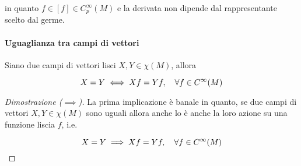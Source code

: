 in quanto $ f \in [f] \in C_{p}^{\infty}(M) $ e la derivata non dipende dal rappresentante scelto dal germe.

\paragraph{Uguaglianza tra campi di vettori}

\begin{theorem}
	Siano due campi di vettori lisci $ X,Y \in \chi(M) $, allora
	
	\begin{equation}
		X = Y \iff X f = Y f \qcomma \forall f \in C^{\infty}(M)
	\end{equation}
\end{theorem}

\begin{proof}[Dimostrazione ($ \implies $)]
	La prima implicazione è banale in quanto, se due campi di vettori $ X,Y \in \chi(M) $ sono uguali allora anche lo è anche la loro azione su una funzione liscia $ f $, i.e.
	
	\begin{equation}
		X = Y \implies X f = Y f \qcomma \forall f \in C^{\infty}(M)
	\end{equation}
\end{proof}

